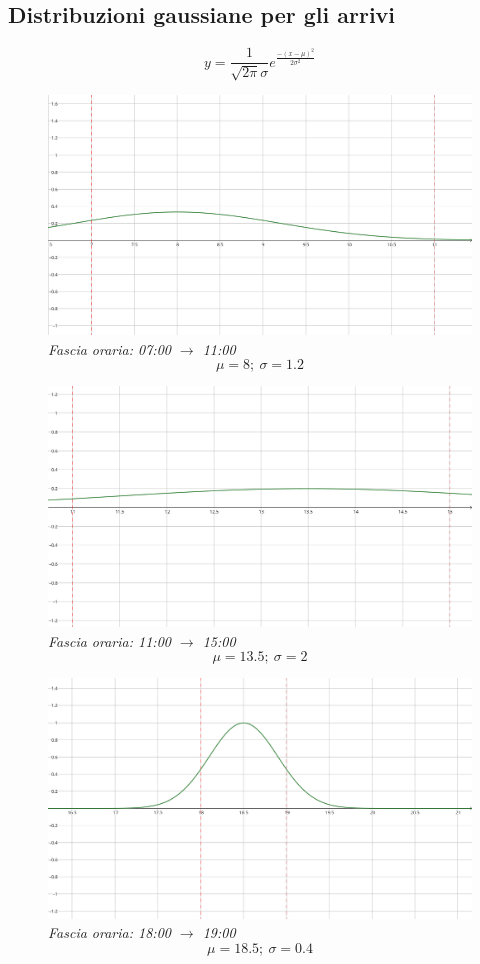 \documentclass[a4paper, 12pt]{article}
\begin{document}
\subsection{Distribuzioni gaussiane per gli arrivi}
\[
y=\frac{1}{\sqrt{2\pi}\sigma}e^\frac{-(x-\mu)^2}{2\sigma^2}
\]

\begin{figure}[H]
\includegraphics[width=\textwidth]{7-11-gaussian}
\centering \textit{Fascia oraria: 07:00 $\rightarrow$ 11:00}
\[ \mu = 8;\ \sigma = 1.2 \]
\end{figure}
\begin{figure}
\includegraphics[width=\textwidth]{11-15-gaussian}
\centering \textit{Fascia oraria: 11:00 $\rightarrow$ 15:00}
\[ \mu = 13.5;\ \sigma = 2 \]
\end{figure}
\begin{figure}
\includegraphics[width=\textwidth]{18-19-gaussian}
\centering \textit{Fascia oraria: 18:00 $\rightarrow$ 19:00}
\[ \mu = 18.5;\ \sigma = 0.4 \]
\end{figure}
\end{document}
